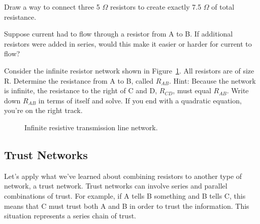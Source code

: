 \begin{blevel}
Draw a way to connect three 5 $\Omega$ resistors to create exactly 7.5 $\Omega$ of total resistance.
\end{blevel}

\begin{alevel}
Suppose current had to flow through a resistor from A to B. If additional resistors were added in series, would this make it easier or harder for current to flow?
\end{alevel}

\begin{clevel}
Consider the infinite resistor network shown in Figure~\ref{F:3TRANS}. All resistors are of size R. Determine the resistance from A to B, called $R_{AB}$. Hint: Because the network is infinite, the resistance to the right of C and D, $R_{CD}$, must equal $R_{AB}$. Write down $R_{AB}$ in terms of itself and solve. If you end with a quadratic equation, you're on the right track.
\end{clevel}

\begin{figure}[H]
\begin{center}
\caption{Infinite resistive transmission line network.}
\label{F:3TRANS}
\end{center}
\end{figure}

\subsection{Trust Networks}
Let's apply what we've learned about combining resistors to another type of network, a trust network. Trust networks can involve series and parallel combinations of trust. For example, if A tells B something and B tells C, this means that C must trust both A and B in order to trust the information. This situation represents a series chain of trust.\par

